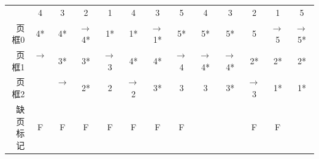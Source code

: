 \begin{solution}
\begin{table}[H]
\begin{tabular}{rcccccccccccc}
        \multicolumn{1}{c}{}     & 4                                  & 3                                  & 2                                    & 1                                   & 4                                   & 3                                    & 5                                   & 4                                    & 3                                    & 2                                   & 1                                   & 5                                    \\ \cline{2-13} 
        \multicolumn{1}{r|}{页框0} & \multicolumn{1}{c|}{4*}            & \multicolumn{1}{c|}{4*}            & \multicolumn{1}{c|}{$\rightarrow$\,4*} & \multicolumn{1}{c|}{1*}             & \multicolumn{1}{c|}{1*}             & \multicolumn{1}{c|}{$\rightarrow$\,1*} & \multicolumn{1}{c|}{5*}             & \multicolumn{1}{c|}{5*}              & \multicolumn{1}{c|}{5*}              & \multicolumn{1}{c|}{5}              & \multicolumn{1}{c|}{$\rightarrow$\,5} & \multicolumn{1}{c|}{$\rightarrow$\,5*} \\ \cline{2-13} 
        \multicolumn{1}{r|}{页框1} & \multicolumn{1}{c|}{$\rightarrow$\,} & \multicolumn{1}{c|}{3*}            & \multicolumn{1}{c|}{3*}              & \multicolumn{1}{c|}{$\rightarrow$\,3} & \multicolumn{1}{c|}{4*}             & \multicolumn{1}{c|}{4*}              & \multicolumn{1}{c|}{$\rightarrow$\,4} & \multicolumn{1}{c|}{$\rightarrow$\,4*} & \multicolumn{1}{c|}{$\rightarrow$\,4*} & \multicolumn{1}{c|}{2*}             & \multicolumn{1}{c|}{2*}             & \multicolumn{1}{c|}{2*}              \\ \cline{2-13} 
        \multicolumn{1}{r|}{页框2} & \multicolumn{1}{c|}{}              & \multicolumn{1}{c|}{$\rightarrow$\,} & \multicolumn{1}{c|}{2*}              & \multicolumn{1}{c|}{2}              & \multicolumn{1}{c|}{$\rightarrow$\,2} & \multicolumn{1}{c|}{3*}              & \multicolumn{1}{c|}{3}              & \multicolumn{1}{c|}{3}               & \multicolumn{1}{c|}{3*}              & \multicolumn{1}{c|}{$\rightarrow$\,3} & \multicolumn{1}{c|}{1*}             & \multicolumn{1}{c|}{1*}              \\ \cline{2-13} 
        缺页标记                     & F                                  & F                                  & F                                    & F                                   & F                                   & F                                    & F                                   &                                      &                                      & F                                   & F                                   &                                     
        \end{tabular}
        \vspace{-1.5em}
    \end{table}
\end{solution}


